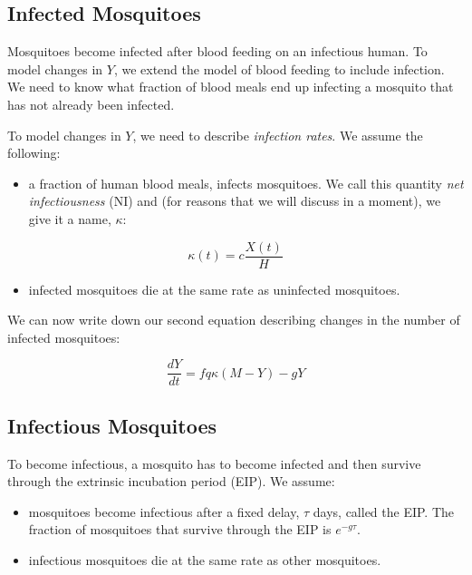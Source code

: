 \documentclass[
]{book}
\providecommand{\tightlist}{%
  \setlength{\itemsep}{0pt}\setlength{\parskip}{0pt}}
\begin{document}
\hypertarget{infected-mosquitoes}{%
\subsection{Infected Mosquitoes}\label{infected-mosquitoes}}

Mosquitoes become infected after blood feeding on an infectious human. To model changes in \(Y\), we extend the model of blood feeding to include infection. We need to know what fraction of blood meals end up infecting a mosquito that has not already been infected.

To model changes in \(Y\), we need to describe \emph{infection rates}. We assume the following:

\begin{itemize}
\tightlist
\item
  a fraction of human blood meals, infects mosquitoes. We call this quantity \emph{net infectiousness} (NI) and (for reasons that we will discuss in a moment), we give it a name, \(\kappa\):
\end{itemize}

\begin{equation}
\kappa(t) = c \frac{X(t)}{H}
\label{eq:kappaDef}
\end{equation}

\begin{itemize}
\tightlist
\item
  infected mosquitoes die at the same rate as uninfected mosquitoes.
\end{itemize}

We can now write down our second equation describing changes in the number of infected mosquitoes:

\begin{equation}
\frac{dY}{dt} = f q \kappa (M-Y) -g Y
\end{equation}

\hypertarget{infectious-mosquitoes}{%
\subsection{Infectious Mosquitoes}\label{infectious-mosquitoes}}

To become infectious, a mosquito has to become infected and then survive through the extrinsic incubation period (EIP). We assume:

\begin{itemize}
\item
  mosquitoes become infectious after a fixed delay, \(\tau\) days, called the EIP. The fraction of mosquitoes that survive through the EIP is \(e^{-g \tau}\).
\item
  infectious mosquitoes die at the same rate as other mosquitoes.
\end{itemize}
\end{document}

